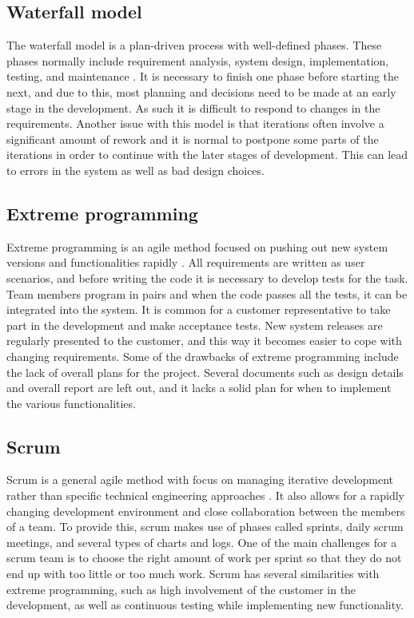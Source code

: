 \subsection{Waterfall model}
The waterfall model is a plan-driven process with well-defined phases. These phases normally include requirement analysis, system design, implementation, testing, and maintenance \cite[p.30-32]{Sommerville}. It is necessary to finish one phase before starting the next, and due to this, most planning and decisions need to be made at an early stage in the development. As such it is difficult to respond to changes in the requirements. Another issue with this model is that iterations often involve a significant amount of rework and it is normal to postpone some parts of the iterations in order to continue with the later stages of development. This can lead to errors in the system as well as bad design choices.

\subsection{Extreme programming}
Extreme programming is an agile method focused on pushing out new system versions and functionalities rapidly \cite[p.64-72]{Sommerville}. All requirements are written as user scenarios, and before writing the code it is necessary to develop tests for the task. Team members program  in pairs and when the code passes all the tests, it can be integrated into the system.  It is common for a customer representative to take part in the development and make acceptance tests. New system releases are regularly presented to the customer, and this way it becomes easier to cope with changing requirements. Some of the drawbacks of extreme programming include the lack of overall plans for the project. Several documents such as design details and overall report are left out, and it lacks a solid plan for when to implement the various functionalities.


\subsection{Scrum }
\label{sec:scrum}
Scrum is a general agile method with focus on managing iterative development rather than specific technical engineering approaches \cite[p.72-74]{Sommerville}. It also allows for a rapidly changing development environment and close collaboration between the members of a team. To provide this, scrum makes use of phases called sprints, daily scrum meetings, and several types of charts and logs. One of the main challenges for a scrum team is to choose the right amount of work per sprint so that they do not end up with too little or too much work. Scrum has several similarities with extreme programming, such as high involvement of the customer in the development, as well as continuous testing while implementing new functionality.

